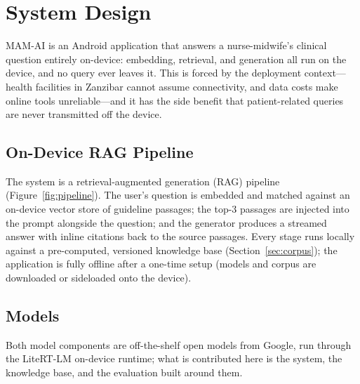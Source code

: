 \section{System Design}
\label{sec:system-design}


MAM-AI is an Android application that answers a nurse-midwife's clinical
question entirely on-device: embedding, retrieval, and generation all run on
the device, and no query ever leaves it. This is forced by the deployment
context---health facilities in Zanzibar cannot assume connectivity, and data
costs make online tools unreliable---and it has the side benefit that
patient-related queries are never transmitted off the device.

\subsection{On-Device RAG Pipeline}

The system is a retrieval-augmented generation (RAG) pipeline
(Figure~\ref{fig:pipeline}). The user's question is embedded and matched
against an on-device vector store of guideline passages; the top-3 passages
are injected into the prompt alongside the question; and the generator
produces a streamed answer with inline citations back to the source
passages. Every stage runs locally against a pre-computed, versioned
knowledge base (Section~\ref{sec:corpus}); the application is fully offline
after a one-time setup (models and corpus are downloaded or sideloaded onto
the device).

\subsection{Models}

Both model components are off-the-shelf open models from Google, run through
the LiteRT-LM on-device runtime; what is contributed here is the system, the
knowledge base, and the evaluation built around them.

